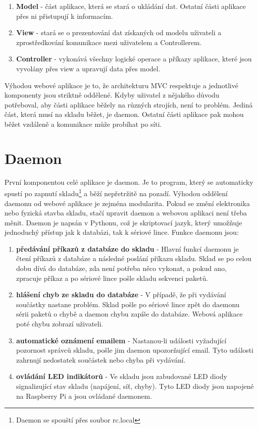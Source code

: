 \documentclass[12pt, a4paper, oneside]{article}
\begin{document}
\begin{enumerate}
\item \textbf{Model} - část aplikace, která se stará o ukládání dat. Ostatní části aplikace přes ni přistupují k informacím.
\item \textbf{View} - stará se o prezentování dat získaných od modelu uživateli a zprostředkování komunikace mezi uživatelem a Controllerem.
\item \textbf{Controller} - vykonává všechny logické operace a příkazy aplikace, které jsou vyvolány přes view a upravují data přes model.
\end{enumerate}

Výhodou webové aplikace je to, že architekturu MVC respektuje a jednotlivé komponenty jsou striktně oddělené. Kdyby uživatel z nějakého důvodu potřeboval, aby části aplikace běžely na různých strojích, není to problém. Jediná část, která musí na skladu běžet, je daemon. Ostatní části aplikace pak mohou běžet vzdáleně a komunikace může probíhat po síti.

\newpage

\section{Daemon}

První komponentou celé aplikace je daemon. Je to program, který se automaticky spustí po zapnutí skladu\footnote{Daemon se spouští přes soubor rc.local} a běží nepřetržitě na pozadí. Výhodou oddělení daemonu od webové aplikace je zejména modularita. Pokud se změní elektronika nebo fyzická stavba skladu, stačí upravit daemon a webovou aplikaci není třeba měnit. Daemon je napsán v Pythonu, což je skriptovací jazyk, který umožňuje jednoduchý přístup jak k databázi, tak k sériové lince. Funkce daemonu jsou:

\begin{enumerate}
\item \textbf{předávání příkazů z databáze do skladu} - Hlavní funkcí daemonu je čtení příkazů z databáze a následné poslání příkazu skladu. Sklad se po celou dobu dívá do databáze, zda není potřeba něco vykonat, a pokud ano, zpracuje příkaz a po sériové lince pošle skladu sekvenci paketů.
\item \textbf{hlášení chyb ze skladu do databáze} - V případě, že při vydávání součástky nastane problém. Sklad pošle po sériové lince zpět do daemonu sérii paketů o chybě a daemon chybu zapíše do databáze. Webová aplikace poté chybu zobrazí uživateli.
\item \textbf{automatické oznámení emailem} - Nastanou-li události vyžadující pozornost správců skladu, pošle jim daemon upozorňující email. Tyto události zahrnují nedostatek součástek nebo chyba při vydávání.
\item \textbf{ovládání LED indikátorů} - Ve skladu jsou zabudované LED diody signalizující stav skladu (napájení, síť, chyby). Tyto LED diody jsou napojené na Raspberry Pi a jsou ovládané daemonem.
\end{enumerate}
\end{document}

